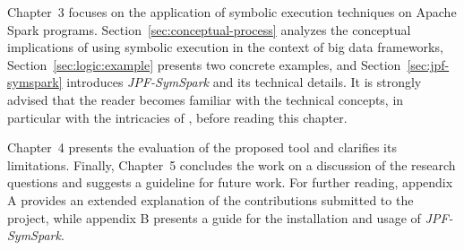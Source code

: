 Chapter~3 focuses on the application of symbolic execution techniques on Apache Spark programs. Section~\ref{sec:conceptual-process} analyzes the conceptual implications of using symbolic execution in the context of big data frameworks, Section~\ref{sec:logic:example} presents two concrete examples, and Section~\ref{sec:jpf-symspark} introduces \textit{JPF-SymSpark} and its technical details. It is strongly advised that the reader becomes familiar with the technical concepts, in particular with the intricacies of \jpf{}, before reading this chapter.

Chapter~4 presents the evaluation of the proposed tool and clarifies its limitations. Finally, Chapter~5 concludes the work on a discussion of the research questions and suggests a guideline for future work. For further reading, appendix A provides an extended explanation of the contributions submitted to the \spf{} project, while appendix B presents a guide for the installation and usage of \textit{JPF-SymSpark}.

 
